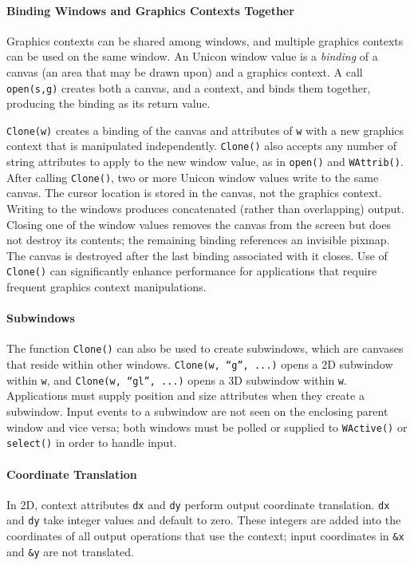 \paragraph{Binding Windows and Graphics Contexts Together}
Graphics contexts can be shared among windows, and multiple graphics
contexts can be used on the same window. An Unicon window value is a
\textit{binding} of a canvas (an area that may be drawn upon) and a
graphics context. A call
\texttt{open(s,{\textquotedbl}g{\textquotedbl})} creates both a canvas,
and a context, and binds them together, producing the binding as its
return value.

\texttt{Clone(w)} creates a binding of the canvas and attributes
of \texttt{w} with a new graphics context that is manipulated
independently. \texttt{Clone()} also accepts any number
of string attributes to apply to the new window value, as in
\texttt{open()} and \texttt{WAttrib()}.
After calling \texttt{Clone()}, two or more Unicon window values
write to the same canvas. The cursor location is stored in the
canvas, not the graphics context. Writing to the windows produces
concatenated (rather than overlapping) output. Closing one of the
window values removes the canvas from the screen but does not destroy
its contents; the remaining binding references an invisible pixmap.
The canvas is destroyed after the last binding associated with it
closes. Use of \texttt{Clone()} can significantly enhance performance
for applications that require frequent graphics context manipulations.

\paragraph{Subwindows}
The function \texttt{Clone()} can also be used to create subwindows,
which are canvases that reside within other windows.
\texttt{Clone(w, {\textquotedblleft}g{\textquotedblright}, ...)}
opens a 2D subwindow within \texttt{w}, and \texttt{Clone(w,
{\textquotedblleft}gl{\textquotedblright}, ...)} opens a 3D subwindow
within \texttt{w}. Applications must supply position and size
attributes when they create a subwindow. Input events
to a subwindow are not seen on the enclosing parent window and vice
versa; both windows must be polled or supplied to \texttt{WActive()} or
\texttt{select()} in order to handle input.

\paragraph{Coordinate Translation}
In 2D, context attributes \texttt{dx} and \texttt{dy} perform output
coordinate translation. \texttt{dx} and \texttt{dy} take integer values
and default to zero. These integers are added into the coordinates of
all output operations that use the context; input coordinates in
\texttt{\&x} and \texttt{\&y} are not translated.

